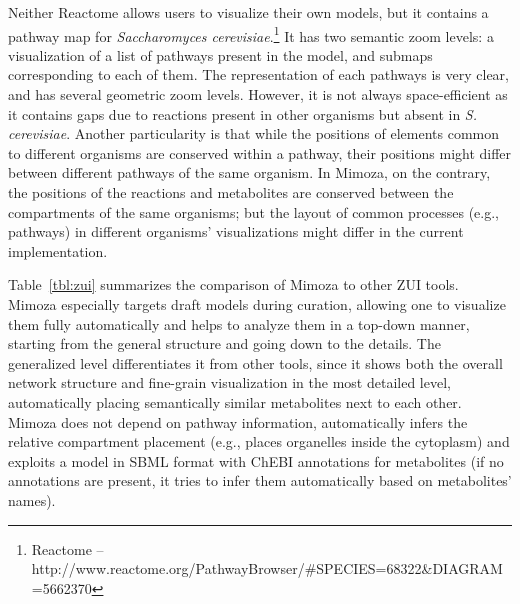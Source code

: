 \documentclass{bmcart}
\begin{document}
Neither Reactome allows users to visualize their own models, but it contains a pathway map for \emph{Saccharomyces cerevisiae}.\footnote{Reactome -- http://www.reactome.org/PathwayBrowser/\#SPECIES=68322\&DIAGRAM=5662370} It has two semantic zoom levels: a visualization of a list of pathways present in the model, and submaps corresponding to each of them. The representation of each pathways is very clear, and has several geometric zoom levels. However, it is not always space-efficient as it contains gaps due to reactions present in other organisms but absent in \emph{S. cerevisiae}. Another particularity is that while the positions of elements common to different organisms are conserved within a pathway, their positions might differ between different pathways of the same organism. In Mimoza, on the contrary, the positions of the reactions and metabolites are conserved between the compartments of the same organisms; but the layout of common processes (e.g., pathways) in different organisms' visualizations might differ in the current implementation.

Table~\ref{tbl:zui} summarizes the comparison of Mimoza to other ZUI tools. Mimoza especially targets draft models during curation, allowing one to visualize them fully automatically and helps to analyze them in a top-down manner, starting from the general structure and going down to the details. The generalized level differentiates it from other tools, since it shows both the overall network structure and fine-grain visualization in the most detailed level, automatically placing semantically similar metabolites next to each other. Mimoza does not depend on pathway information, automatically infers the relative compartment placement (e.g., places organelles inside the cytoplasm) and exploits a model in SBML format with ChEBI annotations for metabolites (if no annotations are present, it tries to infer them automatically based on metabolites' names).
\end{document}
